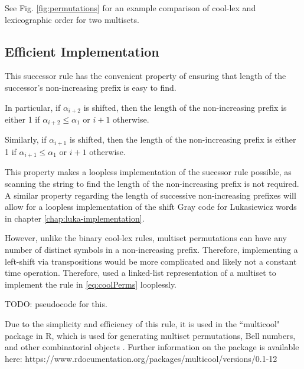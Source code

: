 See Fig. \ref{fig:permutations} for an example comparison of cool-lex and lexicographic order for two multisets.

\subsection{Efficient Implementation}
This successor rule has the convenient property of ensuring that length of the successor's non-increasing prefix is easy to find.

In particular, if $\alpha_{i+2}$ is shifted, then the length of the non-increasing prefix is either 1 if $\alpha_{i+2}\le \alpha_1$ or $i+1$ otherwise. 

Similarly, if $\alpha_{i+1}$ is shifted, then the length of the non-increasing prefix is either 1 if $\alpha_{i+1}\le \alpha_1$ or $i+1$ otherwise. 


This property makes a loopless implementation of the sucessor rule possible, as scanning the string to find the length of the non-increasing prefix is not required.  
A similar property regarding the length of successive non-increasing prefixes will allow for a loopless implementation of the shift Gray code for Lukasiewicz words in chapter \ref{chap:luka-implementation}.

However, unlike the binary cool-lex rules, multiset permutations can have any number of distinct symbols in a non-increasing prefix.  Therefore, implementing a left-shift via transpositions would be more complicated and likely not a constant time operation.  Therefore, \cite{williams2009loopless} used a linked-list representation of a multiset to implement the rule in \ref{eq:coolPerms} looplessly.

TODO: pseudocode for this.

Due to the simplicity and efficiency of this rule, it is used in the ``multicool" package in R, which is used for generating multiset permutations, Bell numbers, and other combinatorial objects \cite{multicool_2021}.   Further information on the package is available here: https://www.rdocumentation.org/packages/multicool/versions/0.1-12




